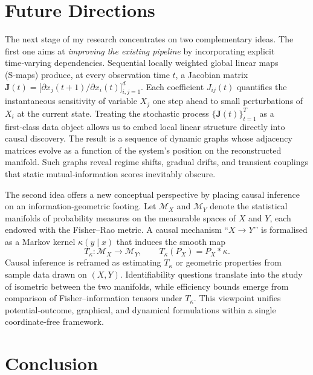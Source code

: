 \documentclass[14pt]{extarticle}
\begin{document}
	
	\section{Future Directions} \label{sec:future}
	
	The next stage of my research concentrates on two complementary ideas.  
	The first one aims at \emph{improving the existing pipeline} by incorporating explicit time‑varying dependencies.  
	Sequential locally weighted global linear maps (S‑maps) produce, at every observation time $t$, a Jacobian matrix $\mathbf J(t)=\bigl[\partial x_j(t+1)\!/\!\partial x_i(t)\bigr]_{i,j=1}^{d}$.  
	Each coefficient $J_{ij}(t)$ quantifies the instantaneous sensitivity of variable $X_j$ one step ahead to small perturbations of $X_i$ at the current state.  
	Treating the stochastic process $\{\mathbf J(t)\}_{t=1}^{T}$ as a first‑class data object allows us to embed local linear structure directly into causal discovery.   
	The result is a sequence of dynamic graphs whose adjacency matrices evolve as a function of the system’s position on the reconstructed manifold.  
	Such graphs reveal regime shifts, gradual drifts, and transient couplings that static mutual‑information scores inevitably obscure.  
	
	The second idea offers a new conceptual perspective by placing causal inference on an information‑geometric footing.  
	Let $\mathcal M_X$ and $\mathcal M_Y$ denote the statistical manifolds of probability measures on the measurable spaces of $X$ and $Y$, each endowed with the Fisher–Rao metric.  
	A causal mechanism “$X\!\rightarrow\!Y$’’ is formalised as a Markov kernel $\kappa(y\!\mid\!x)$ that induces the smooth map
	$$
	T_\kappa:\mathcal M_X\longrightarrow\mathcal M_Y,\qquad T_\kappa(P_X)=P_X\ast\kappa.
	$$
	Causal inference is reframed as estimating $T_\kappa$ or geometric properties from sample data drawn on $(X,Y)$.  
	Identifiability questions translate into the study of isometric between the two manifolds, while efficiency bounds emerge from comparison of Fisher–information tensors under $T_\kappa$.  
	This viewpoint unifies potential‑outcome, graphical, and dynamical formulations within a single coordinate‑free framework.  
	
	\section{Conclusion} \label{sec:conclusion}
	
\end{document}
